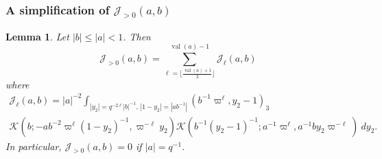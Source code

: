 \documentclass[12pt]{amsart}
\newcommand{\abs}[1]{\left|{#1}\right|}
\newcommand{\J}{\mathcal{J}}
\newcommand{\val}{{\operatorname{val}}}
\newcommand{\Kl}{\mathcal{K}}
\newtheorem{lemma}[theorem]{Lemma}
\theoremstyle{remark}
\begin{document}
\subsubsection{A simplification of $\J_{>0}(a,b)$}
\begin{lemma}\label{lem j>0}
Let $\abs{b}\le \abs{a}< 1$. Then
\[
\J_{>0}(a,b)=\sum_{\ell=\lfloor \frac{\val(a)+1}2\rfloor}^{\val(a)-1}\J_\ell(a,b)
\]
where
\begin{multline*}
\J_\ell(a,b)=\abs{a}^{-2}\int_{\abs{y_2}=q^{-2\ell}\abs{b}^{-1},\,\abs{1-y_2}=\abs{ab^{-1}}} (b^{-1}\varpi^\ell,y_2-1)_3\\ \Kl(b;-ab^{-2}\varpi^\ell(1-y_2)^{-1},\varpi^{-\ell} y_2)\Kl(b^{-1}(y_2-1)^{-1};a^{-1}\varpi^\ell ,a^{-1}by_2\varpi^{-\ell} )\ dy_2.
\end{multline*}
In particular, $\J_{>0}(a,b)=0$ if $\abs{a}=q^{-1}$.
\end{lemma}
\end{document}
